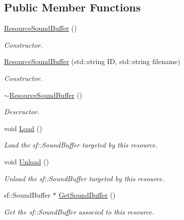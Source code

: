 \subsection*{Public Member Functions}
\begin{DoxyCompactItemize}
\item 
\mbox{\hyperlink{classsfmlbe_1_1_resource_sound_buffer_a88d7088f7f0e02879c0a62563851cb67}{Resource\+Sound\+Buffer}} ()
\begin{DoxyCompactList}\small\item\em Constructor. \end{DoxyCompactList}\item 
\mbox{\hyperlink{classsfmlbe_1_1_resource_sound_buffer_a6f01706abb7c87383e0ddffbf8650837}{Resource\+Sound\+Buffer}} (std\+::string ID, std\+::string filename)
\begin{DoxyCompactList}\small\item\em Constructor. \end{DoxyCompactList}\item 
\mbox{\hyperlink{classsfmlbe_1_1_resource_sound_buffer_a28e17a59ffd9de59eb6394ed564efc11}{$\sim$\+Resource\+Sound\+Buffer}} ()
\begin{DoxyCompactList}\small\item\em Descructor. \end{DoxyCompactList}\item 
void \mbox{\hyperlink{classsfmlbe_1_1_resource_sound_buffer_a1207531bb0e5355f90cf4a7f67734555}{Load}} ()
\begin{DoxyCompactList}\small\item\em Load the sf\+::\+Sound\+Buffer targeted by this resource. \end{DoxyCompactList}\item 
void \mbox{\hyperlink{classsfmlbe_1_1_resource_sound_buffer_aea7707b97d4451935597671c0e162a7b}{Unload}} ()
\begin{DoxyCompactList}\small\item\em Unload the sf\+::\+Sound\+Buffer targeted by this resource. \end{DoxyCompactList}\item 
sf\+::\+Sound\+Buffer $\ast$ \mbox{\hyperlink{classsfmlbe_1_1_resource_sound_buffer_a56043b6124e92d99a25e7756022088cb}{Get\+Sound\+Buffer}} ()
\begin{DoxyCompactList}\small\item\em Get the sf\+::\+Sound\+Buffer associed to this resource. \end{DoxyCompactList}\end{DoxyCompactItemize}
